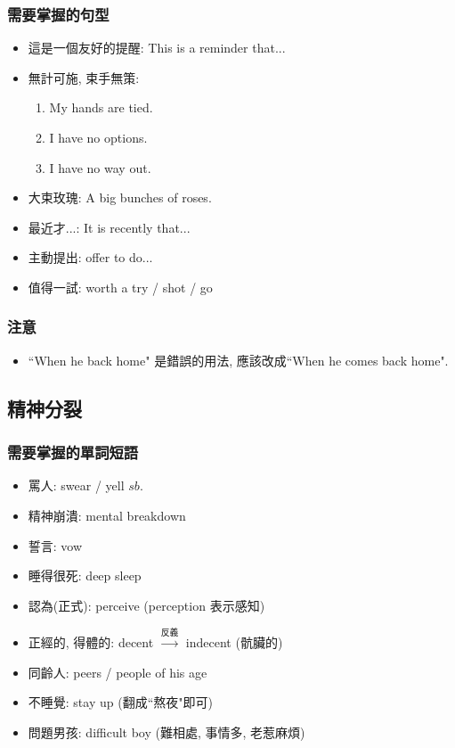 \subsubsection*{需要掌握的句型}
\begin{multicols}{2}
\begin{itemize}
  \itemsep0em
  \item 這是一個友好的提醒: This is a  reminder that...
  \item 無計可施, 束手無策:
  \begin{enumerate}
    \itemsep0em
    \item My hands are tied.
    \item I have no options.
    \item I have no way out.
  \end{enumerate}
  \item 大束玫瑰: A big bunches of roses.
  \item 最近才...: It is  recently that...
  \item 主動提出: offer to do...
  \item 值得一試: worth a try / shot / go
\end{itemize}
\end{multicols}

\subsubsection*{注意}
\begin{itemize}
  \item ``When he back home" 是錯誤的用法, 應該改成``When he comes back home".
\end{itemize}

\subsection{精神分裂}
\subsubsection*{需要掌握的單詞短語}
\begin{multicols}{2}
\begin{itemize}
  \itemsep0em
  \item 罵人: swear / yell  $sb.$
  \item 精神崩潰: mental breakdown
  \item 誓言: vow
  \item 睡得很死: deep sleep
  \item 認為(正式): perceive (perception 表示感知)
  \item 正經的, 得體的: decent $\xrightarrow{\text{反義}}$ indecent (骯臟的)
  \item 同齡人: peers / people of his age
  \item 不睡覺: stay up (翻成``熬夜"即可)
  \item 問題男孩: difficult boy (難相處, 事情多, 老惹麻煩)
\end{itemize}
\end{multicols}

